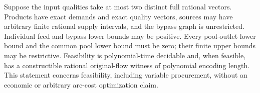 \begin{theorem}
\label{s5:two-vector-theorem}
Suppose the input qualities take at most two distinct full rational
vectors. Products have exact demands and exact quality vectors, sources
may have arbitrary finite rational supply intervals, and the bypass
graph is unrestricted. Individual feed and bypass lower bounds may be
positive. Every pool-outlet lower bound and the common pool lower bound
must be zero; their finite upper bounds may be restrictive. Feasibility
is polynomial-time decidable and, when feasible, has a constructible
rational original-flow witness of polynomial encoding length. This
statement concerns feasibility, including variable procurement, without
an economic or arbitrary arc-cost optimization claim.
\end{theorem}
